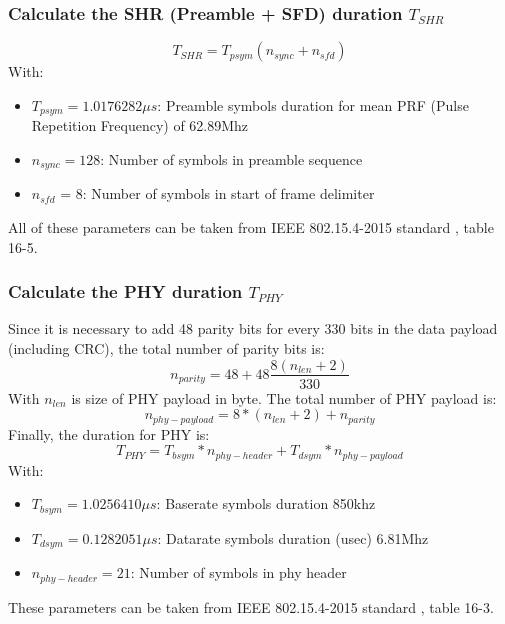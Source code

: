 \documentclass[\main/main.tex]{subfiles}
\begin{document}
\subsubsection{Calculate the SHR (Preamble + SFD) duration $T_{SHR}$}
\begin{equation}
    T_{SHR} = T_{psym}(n_{sync} + n_{sfd})
\end{equation}
With:
\begin{itemize}
    \item $T_{psym} = 1.0176282 \mu s$: Preamble symbols duration for mean PRF (Pulse Repetition Frequency) of 62.89Mhz
    \item $n_{sync} = 128 $: Number of symbols in preamble sequence
    \item $n_{sfd}$ = 8: Number of symbols in start of frame delimiter
\end{itemize}
All of these parameters can be taken from IEEE 802.15.4-2015 standard \cite{IEEE_Std_802_15_4_2015}, table 16-5.

\subsubsection{Calculate the PHY duration $T_{PHY}$}
Since it is necessary to add 48 parity bits for every 330 bits in the data payload (including CRC), the total number of parity bits is:
\begin{equation}
    n_{parity} = 48 + 48\frac{8(n_{len}+2)}{330}
\end{equation}
With $n_{len}$ is size of PHY payload in byte.
The total number of PHY payload is:
\begin{equation}
    n_{phy-payload} = 8*(n_{len}+2) + n_{parity}
\end{equation}
Finally, the duration for PHY is:
\begin{equation}
    T_{PHY} = T_{bsym} * n_{phy-header} + T_{dsym} * n_{phy-payload}
\end{equation}
With:
\begin{itemize}
    \item $T_{bsym} = 1.0256410 \mu s$: Baserate symbols duration 850khz
    \item $T_{dsym} = 0.1282051 \mu s$: Datarate symbols duration (usec) 6.81Mhz
    \item $n_{phy-header} = 21$: Number of symbols in phy header
\end{itemize}
These parameters can be taken from IEEE 802.15.4-2015 standard \cite{IEEE_Std_802_15_4_2015}, table 16-3.
\end{document}
